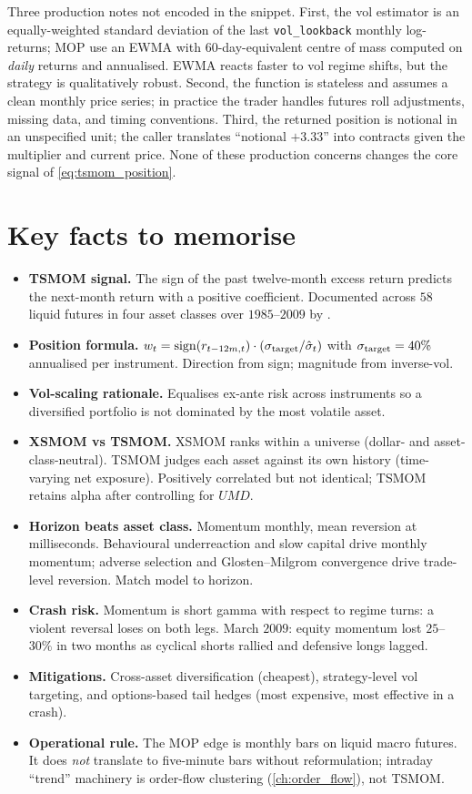 Three production notes not encoded in the snippet. First, the vol
estimator is an equally-weighted standard deviation of the last
\texttt{vol\_lookback} monthly log-returns; MOP use an EWMA with
$60$-day-equivalent centre of mass computed on \emph{daily}
returns and annualised. EWMA reacts faster to vol regime shifts,
but the strategy is qualitatively robust. Second, the function is
stateless and assumes a clean monthly price series; in practice
the trader handles futures roll adjustments, missing data, and
timing conventions. Third, the returned position is notional in
an unspecified unit; the caller translates ``notional $+3.33$''
into contracts given the multiplier and current price. None of
these production concerns changes the core signal of
\eqref{eq:tsmom_position}.

\section{Key facts to memorise}
\label{sec:ch12_keyfacts}

\begin{itemize}
  \item \textbf{TSMOM signal.} The sign of the past twelve-month
  excess return predicts the next-month return with a positive
  coefficient. Documented across $58$ liquid futures in four
  asset classes over $1985$--$2009$ by \citeMOP.
  \item \textbf{Position formula.}
  $w_t = \operatorname{sign}(r_{t-12m,t}) \cdot
  (\sigma_{\text{target}}/\hat{\sigma}_t)$ with
  $\sigma_{\text{target}} = 40\%$ annualised per instrument.
  Direction from sign; magnitude from inverse-vol.
  \item \textbf{Vol-scaling rationale.} Equalises ex-ante risk
  across instruments so a diversified portfolio is not dominated
  by the most volatile asset.
  \item \textbf{XSMOM vs TSMOM.} XSMOM ranks within a universe
  (dollar- and asset-class-neutral). TSMOM judges each asset
  against its own history (time-varying net exposure). Positively
  correlated but not identical; TSMOM retains alpha after
  controlling for $\textit{UMD}$.
  \item \textbf{Horizon beats asset class.} Momentum monthly, mean
  reversion at milliseconds. Behavioural underreaction and slow
  capital drive monthly momentum; adverse selection and
  Glosten--Milgrom convergence drive trade-level reversion. Match
  model to horizon.
  \item \textbf{Crash risk.} Momentum is short gamma with respect
  to regime turns: a violent reversal loses on both legs. March
  $2009$: equity momentum lost $25$--$30\%$ in two months as
  cyclical shorts rallied and defensive longs lagged.
  \item \textbf{Mitigations.} Cross-asset diversification
  (cheapest), strategy-level vol targeting, and options-based tail
  hedges (most expensive, most effective in a crash).
  \item \textbf{Operational rule.} The MOP edge is monthly bars on
  liquid macro futures. It does \emph{not} translate to
  five-minute bars without reformulation; intraday ``trend''
  machinery is order-flow clustering (\cref{ch:order_flow}), not
  TSMOM.
\end{itemize}
